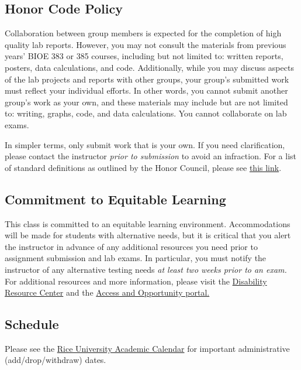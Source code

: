 \documentclass{article}
\begin{document}
\subsection*{Honor Code Policy}

Collaboration between group members is expected for the completion of high quality lab reports. However, you may not consult the materials from previous years' BIOE 383 or 385 courses, including but not limited to: written reports, posters, data calculations, and code. Additionally, while you may discuss aspects of the lab projects and reports with other groups, your group's submitted work must reflect your individual efforts. In other words, you cannot submit another group's work as your own, and these materials may include but are not limited to: writing, graphs, code, and data calculations. You cannot collaborate on lab exams.

In simpler terms, only submit work that is your own. If you need clarification, please contact the instructor \textit{prior to submission} to avoid an infraction. For a list of standard definitions as outlined by the Honor Council, please see \href{https://cpb-us-e1.wpmucdn.com/blogs.rice.edu/dist/c/490/files/2022/08/Honor-Council-Standard-Definitions-and-Policies.pdf}{this link}.

\subsection*{Commitment to Equitable Learning}
This class is committed to an equitable learning environment. Accommodations will be made for students with alternative needs, but it is critical that you alert the instructor in advance of any additional resources you need prior to assignment submission and lab exams. In particular, you must notify the instructor of any alternative testing needs \textit{at least two weeks prior to an exam.} For additional resources and more information, please visit the \href{https://drc.rice.edu/}{Disability Resource Center} and the \href{https://aop.rice.edu/}{Access and Opportunity portal.}

\subsection*{Schedule}
Please see the \href{https://registrar.rice.edu/calendars/fall-semester-2022}{Rice University Academic Calendar} for important administrative (add/drop/withdraw) dates.\\
\end{document}

